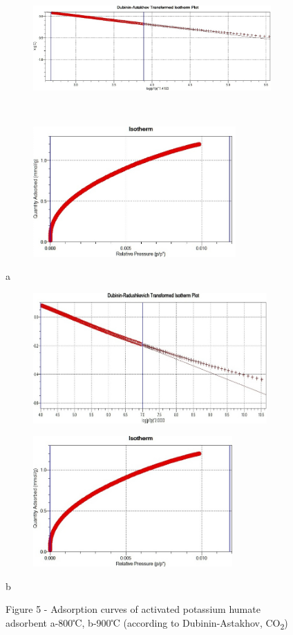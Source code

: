 \begin{figure}[H]
    \centering
    \begin{subfigure}[t]{0.45\textwidth}
        \centering
        \includegraphics[height=5cm]{media/chem2/image104}
    \end{subfigure}
    \begin{subfigure}[t]{0.45\textwidth}
        \centering
        \includegraphics[height=5cm]{media/chem2/image104.1}
    \end{subfigure}
    \caption*{a}
    
    \begin{subfigure}[t]{0.45\textwidth}
        \centering
        \includegraphics[height=5cm]{media/chem2/image105}
    \end{subfigure}
    \begin{subfigure}[t]{0.45\textwidth}
        \centering
        \includegraphics[height=5cm]{media/chem2/image106}
    \end{subfigure}
    \caption*{b}
    \caption*{Figure 5 - Adsorption curves of activated potassium humate adsorbent a-800℃, b-900℃ (according to Dubinin-Astakhov, CO\textsubscript{2})}
\end{figure}

